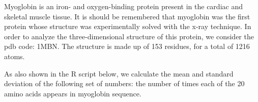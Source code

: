 \documentclass[
  letterpaper,
  DIV=11,
  numbers=noendperiod]{scrreprt}
\begin{document}
\begin{tcolorbox}[enhanced jigsaw, arc=.35mm, breakable, toptitle=1mm, opacityback=0, bottomrule=.15mm, toprule=.15mm, rightrule=.15mm, titlerule=0mm, opacitybacktitle=0.6, coltitle=black, left=2mm, title=\textcolor{quarto-callout-tip-color}{\faLightbulb}\hspace{0.5em}{Biological focus: Myoglobin}, bottomtitle=1mm, leftrule=.75mm, colback=white, colbacktitle=quarto-callout-tip-color!10!white, colframe=quarto-callout-tip-color-frame]

Myoglobin is an iron- and oxygen-binding protein present in the cardiac
and skeletal muscle tissue. It is should be remembered that myoglobin
was the first protein whose structure was experimentally solved with the
x-ray technique. In order to analyze the three-dimensional structure of
this protein, we consider the pdb code: 1MBN. The structure is made up
of 153 residues, for a total of 1216 atoms.

\end{tcolorbox}

As also shown in the R script below, we calculate the mean and standard
deviation of the following set of numbers: the number of times each of
the 20 amino acids appears in myoglobin sequence.
\end{document}
